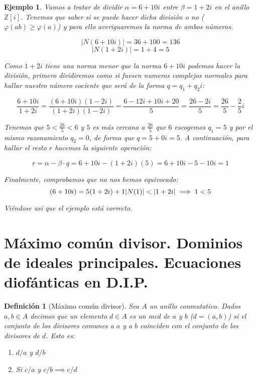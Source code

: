 \documentclass[11pt, a4paper, titlepage]{article}
\providecommand{\ent}{\mathbb{Z}}
\providecommand{\abs}[1]{\lvert#1\rvert}
\theoremstyle{theorem-style}
\theoremstyle{definition-style}
\newtheorem*{ndef}{Definición}
\theoremstyle{remark-style}
\theoremstyle{example-style}
\newtheorem*{ejemplo}{Ejemplo}
\newenvironment{nlist}
{\begin{enumerate}
\renewcommand\labelenumi{(\emph{\roman{enumi})}}}
{\end{enumerate}}
\begin{document}
\begin{ejemplo}
Vamos a tratar de dividir $\alpha=6+10i$ entre $\beta=1+2i$ en el anillo $\ent[i]$. Tenemos que saber si se puede hacer dicha división o no ($\varphi(ab) \ge \varphi(a)$) y para ello averiguaremos la norma de ambos números.

$$\abs{N(6+10i)}=36+100=136$$
$$\abs{N(1+2i)}=1+4=5$$

Como $1+2i$ tiene una norma menor que la norma $6+10i$ podemos hacer la división, primero dividiremos como si fuesen numeros complejos normales para hallar nuestro número cociente que será de la forma $q=q_1+q_2i$:

\[
	\frac{6+10i}{1+2i}=\frac{(6+10i)(1-2i)}{(1+2i)(1-2i)}=\frac{6-12i+10i+20}{5}=\frac{26-2i}{5}=\frac{26}{5}-\frac{2}{5}i
\]

Tenemos que $5<\frac{26}{5}<6$ y $5$ es más cercano a $\frac{26}{5}$ que $6$ escogemos $q_1=5$ y por el mismo razonamiento $q_2=0$, de forma que $q=5+0i=5$. A continuación, para hallar el resto $r$ hacemos la siguiente operación:

\[
	r=\alpha-\beta \cdot q = 6+10i - (1+2i)(5)=6+10i-5-10i=1
\]

Finalmente, comprobamos que no nos hemos equivocado:
\[
	(6+10i)=5(1+2i)+1\\
	\abs{N(1)}<\abs{1+2i} \implies 1<5
\]

Viéndose así que el ejemplo está correcto.

\end{ejemplo}

\section{Máximo común divisor. Dominios de ideales principales. Ecuaciones diofánticas en D.I.P.}


\begin{ndef}[Máximo común divisor]

Sea $A$ un anillo conmutativo. Dados $a,b \in A$ decimos que un elemento $d\in A$ es un \textit{mcd} de $a$ y $b$ ($d=(a,b)$) si el conjunto de los divisores comunes a $a$ y a $b$ coinciden con el conjunto de los divisores de $d$. Esto es:

\begin{nlist}
	\item $d/a$ y $d/b$
	\item Si $c/a$ y $c/b \implies c/d$ 
\end{nlist} 
	
\end{ndef}
\end{document}
